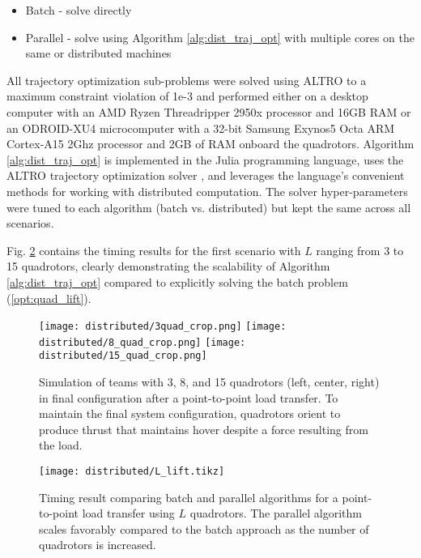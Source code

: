 \documentclass[../root.tex]{subfiles}
\begin{document}
\begin{itemize}
	\item Batch - solve directly
	\item Parallel - solve using Algorithm \ref{alg:dist_traj_opt} with multiple cores on the same or distributed machines
\end{itemize}

All trajectory optimization sub-problems were solved using ALTRO to a maximum
constraint violation of 1e{-}3 and performed either on a desktop computer
with an AMD Ryzen Threadripper 2950x processor and 16GB RAM or an ODROID-XU4
microcomputer with a 32-bit Samsung Exynos5 Octa ARM Cortex-A15 2Ghz
processor and 2GB of RAM onboard the quadrotors. Algorithm
\ref{alg:dist_traj_opt} is implemented in the Julia programming language,
 uses the ALTRO trajectory optimization solver
\cite{howell_ALTRO_2019}, and leverages the language's convenient methods for
working with distributed computation. The solver hyper-parameters were tuned
to each algorithm (batch vs. distributed) but kept the same across all
scenarios.

Fig. \ref{fig:n_lift} contains the timing results for the first scenario with
$L$ ranging from 3 to 15 quadrotors, clearly demonstrating the scalability of
Algorithm \ref{alg:dist_traj_opt} compared to explicitly solving the batch
problem (\ref{opt:quad_lift}).

\begin{figure}[t]
	\centering
	\minipage{2.85cm}
	\texttt{[image: distributed/3quad\_crop.png]}
	\endminipage
	\minipage{2.85cm}
	\texttt{[image: distributed/8\_quad\_crop.png]}
	\endminipage
	\minipage{2.85cm}%
	\texttt{[image: distributed/15\_quad\_crop.png]}
	\endminipage
	\caption{Simulation of teams with 3, 8, and 15 quadrotors (left, center,
	right) in final configuration after a point-to-point load transfer. To
	maintain the final system configuration, quadrotors orient to produce
	thrust that maintains hover despite a force resulting from the load.}
	\label{Lsystem}
\end{figure}

\begin{figure}[t]
	\centering
	\texttt{[image: distributed/L\_lift.tikz]}
	\caption{Timing result comparing batch and parallel algorithms for a
	point-to-point load transfer using $L$ quadrotors. The parallel algorithm
	scales favorably compared to the batch approach as the number of
	quadrotors is increased.}
	\label{fig:n_lift}
\end{figure}
\end{document}
